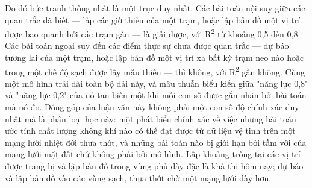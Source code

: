 Do đó bức tranh thống nhất là một trục duy nhất. Các bài toán nội suy giữa các quan trắc đã biết --- lấp các giờ thiếu của một trạm, hoặc lập bản đồ một vị trí được bao quanh bởi các trạm gần --- là giải được, với R\textsuperscript{2} từ khoảng 0,5 đến 0,8. Các bài toán ngoại suy đến các điểm thực sự chưa được quan trắc --- dự báo tương lai của một trạm, hoặc lập bản đồ một vị trí xa bất kỳ trạm neo nào hoặc trong một chế độ sạch được lấy mẫu thiếu --- thì không, với R\textsuperscript{2} gần không. Cùng một mô hình trải dài toàn bộ dải này, và mâu thuẫn biểu kiến giữa "năng lực 0,8" và "năng lực 0,2" của nó tan biến một khi mỗi con số được gắn nhãn bởi bài toán mà nó đo. Đóng góp của luận văn này không phải một con số độ chính xác duy nhất mà là phân loại học này: một phát biểu chính xác về việc những bài toán ước tính chất lượng không khí nào có thể đạt được từ dữ liệu vệ tinh trên một mạng lưới nhiệt đới thưa thớt, và những bài toán nào bị giới hạn bởi tầm với của mạng lưới mặt đất chứ không phải bởi mô hình. Lấp khoảng trống tại các vị trí được trang bị và lập bản đồ trong vùng phủ dày đặc là khả thi hôm nay; dự báo và lập bản đồ vào các vùng sạch, thưa thớt chờ một mạng lưới dày hơn.


